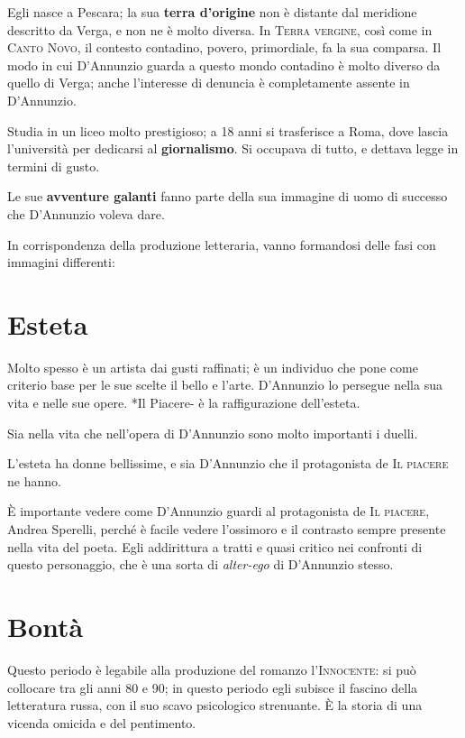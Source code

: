 \documentclass{book}
\newcommand{\evidenziatore}[1]{\textbf{#1}}
\begin{document}
Egli nasce a Pescara; la sua \evidenziatore{terra d’origine} non è
distante dal meridione descritto da Verga, e non ne è molto diversa. In
\textsc{Terra vergine}, così come in \textsc{Canto Novo}, il contesto
contadino, povero, primordiale, fa la sua comparsa. Il modo in cui
D'Annunzio guarda a questo mondo contadino è molto diverso da quello di
Verga; anche l'interesse di denuncia è completamente assente in
D'Annunzio.

Studia in un liceo molto prestigioso; a 18 anni si trasferisce a Roma,
dove lascia l'università per dedicarsi al \evidenziatore{giornalismo}.
Si occupava di tutto, e dettava legge in termini di gusto.

Le sue \evidenziatore{avventure galanti} fanno parte della sua immagine
di uomo di successo che D'Annunzio voleva dare.

In corrispondenza della produzione letteraria, vanno formandosi delle
fasi con immagini differenti:

\section{Esteta}

Molto spesso è un artista dai gusti raffinati; è un individuo che pone
come criterio base per le sue scelte il bello e l'arte. D'Annunzio lo
persegue nella sua vita e nelle sue opere. *Il Piacere- è la
raffigurazione dell'esteta.

Sia nella vita che nell'opera di D'Annunzio sono molto importanti i
duelli.

L'esteta ha donne bellissime, e sia D'Annunzio che il protagonista de
\textsc{Il piacere} ne hanno.

È importante vedere come D'Annunzio guardi al protagonista de \textsc{Il
piacere}, Andrea Sperelli, perché è facile vedere l'ossimoro e il
contrasto sempre presente nella vita del poeta. Egli addirittura a
tratti e quasi critico nei confronti di questo personaggio, che è una
sorta di \emph{alter-ego} di D'Annunzio stesso.

\section{Bontà}

Questo periodo è legabile alla produzione del romanzo
l'\textsc{Innocente}: si può collocare tra gli anni 80 e 90; in questo
periodo egli subisce il fascino della letteratura russa, con il suo
scavo psicologico strenuante. È la storia di una vicenda omicida e del
pentimento.
\end{document}
